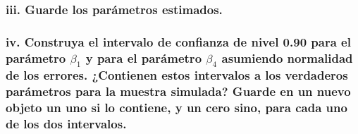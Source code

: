 \documentclass[]{article}
\begin{document}
\hypertarget{iii.-guarde-los-parametros-estimados.}{%
\subsubsection{iii. Guarde los parámetros
estimados.}\label{iii.-guarde-los-parametros-estimados.}}

\hypertarget{iv.-construya-el-intervalo-de-confianza-de-nivel-0.90-para-el-parametro-beta_1-y-para-el-parametro-beta_4-asumiendo-normalidad-de-los-errores.-contienen-estos-intervalos-a-los-verdaderos-parametros-para-la-muestra-simulada-guarde-en-un-nuevo-objeto-un-uno-si-lo-contiene-y-un-cero-sino-para-cada-uno-de-los-dos-intervalos.}{%
\subsubsection{\texorpdfstring{iv. Construya el intervalo de confianza
de nivel 0.90 para el parámetro \(\beta_1\) y para el parámetro
\(\beta_4\) asumiendo normalidad de los errores. ¿Contienen estos
intervalos a los verdaderos parámetros para la muestra simulada? Guarde
en un nuevo objeto un uno si lo contiene, y un cero sino, para cada uno
de los dos
intervalos.}{iv. Construya el intervalo de confianza de nivel 0.90 para el parámetro \textbackslash beta\_1 y para el parámetro \textbackslash beta\_4 asumiendo normalidad de los errores. ¿Contienen estos intervalos a los verdaderos parámetros para la muestra simulada? Guarde en un nuevo objeto un uno si lo contiene, y un cero sino, para cada uno de los dos intervalos.}}\label{iv.-construya-el-intervalo-de-confianza-de-nivel-0.90-para-el-parametro-beta_1-y-para-el-parametro-beta_4-asumiendo-normalidad-de-los-errores.-contienen-estos-intervalos-a-los-verdaderos-parametros-para-la-muestra-simulada-guarde-en-un-nuevo-objeto-un-uno-si-lo-contiene-y-un-cero-sino-para-cada-uno-de-los-dos-intervalos.}}
\end{document}
